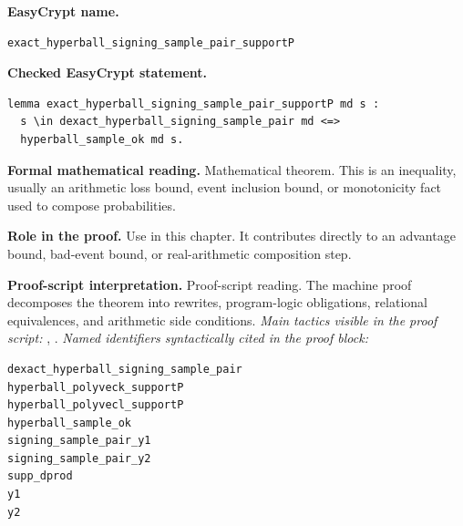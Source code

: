 \begin{formaltheorem}
\noindent\textbf{EasyCrypt name.}
\begin{lstlisting}[language=EasyCrypt,basicstyle=\ttfamily\scriptsize]
exact_hyperball_signing_sample_pair_supportP
\end{lstlisting}
\noindent\textbf{Checked EasyCrypt statement.}
\begin{lstlisting}[language=EasyCrypt,basicstyle=\ttfamily\scriptsize]
lemma exact_hyperball_signing_sample_pair_supportP md s :
  s \in dexact_hyperball_signing_sample_pair md <=>
  hyperball_sample_ok md s.
\end{lstlisting}
\noindent\textbf{Formal mathematical reading.}
Mathematical theorem. This is an inequality, usually an arithmetic loss bound, event inclusion bound, or monotonicity fact used to compose probabilities.

\noindent\textbf{Role in the proof.}
Use in this chapter. It contributes directly to an advantage bound, bad-event bound, or real-arithmetic composition step.

\noindent\textbf{Proof-script interpretation.}
Proof-script reading. The machine proof decomposes the theorem into rewrites, program-logic obligations, relational equivalences, and arithmetic side conditions.
\emph{Main tactics visible in the proof script:} , .
\emph{Named identifiers syntactically cited in the proof block:}
\begin{lstlisting}[language=EasyCrypt,basicstyle=\ttfamily\scriptsize]
dexact_hyperball_signing_sample_pair
hyperball_polyveck_supportP
hyperball_polyvecl_supportP
hyperball_sample_ok
signing_sample_pair_y1
signing_sample_pair_y2
supp_dprod
y1
y2
\end{lstlisting}

\end{formaltheorem}

